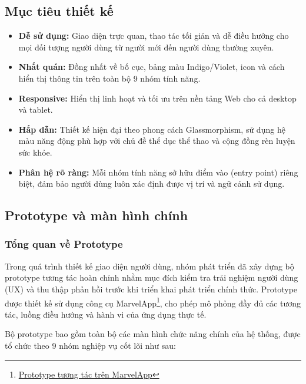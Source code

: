 \subsection{Mục tiêu thiết kế}
\label{subsec:ui_goals}
\begin{itemize}
    \item \textbf{Dễ sử dụng:} Giao diện trực quan, thao tác tối giản và dễ điều hướng cho mọi đối tượng người dùng từ người mới đến người dùng thường xuyên.
    \item \textbf{Nhất quán:} Đồng nhất về bố cục, bảng màu Indigo/Violet, icon và cách hiển thị thông tin trên toàn bộ 9 nhóm tính năng.
    \item \textbf{Responsive:} Hiển thị linh hoạt và tối ưu trên nền tảng Web cho cả desktop và tablet.
    \item \textbf{Hấp dẫn:} Thiết kế hiện đại theo phong cách Glassmorphism, sử dụng hệ màu năng động phù hợp với chủ đề thể dục thể thao và cộng đồng rèn luyện sức khỏe.
    \item \textbf{Phân hệ rõ ràng:} Mỗi nhóm tính năng sở hữu điểm vào (entry point) riêng biệt, đảm bảo người dùng luôn xác định được vị trí và ngữ cảnh sử dụng.
\end{itemize}

\subsection{Prototype và màn hình chính}
\label{subsec:ui_prototype}

\subsubsection{Tổng quan về Prototype}
Trong quá trình thiết kế giao diện người dùng, nhóm phát triển đã xây dựng bộ prototype tương tác hoàn chỉnh nhằm mục đích kiểm tra trải nghiệm người dùng (UX) và thu thập phản hồi trước khi triển khai phát triển chính thức. Prototype được thiết kế sử dụng công cụ MarvelApp\footnote{\href{https://marvelapp.com/prototype/ch16ai1}{Prototype tương tác trên MarvelApp}}, cho phép mô phỏng đầy đủ các tương tác, luồng điều hướng và hành vi của ứng dụng thực tế.

Bộ prototype bao gồm toàn bộ các màn hình chức năng chính của hệ thống, được tổ chức theo 9 nhóm nghiệp vụ cốt lõi như sau:

